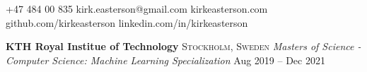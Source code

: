 \documentclass[10pt,letterpaper]{article}
\begin{document}


\begin{center}\spacedhrule{-.9em}{-.9em}\end{center}
\small +47 484 00 835 \hfill{}\hfill kirk.easterson@gmail.com \hfill{}\hfill kirkeasterson.com \hfill{}\hfill github.com/kirkeasterson \hfill{}\hfill linkedin.com/in/kirkeasterson
\begin{center}\spacedhrule{-.4em}{-1.3em}\end{center}













\headedsection
{\textbf{KTH Royal Institue of Technology}}
{\textsc{Stockholm, Sweden}} {
	\headedsubsection
	{\textit{Masters of Science - Computer Science: Machine Learning Specialization}}
	{Aug 2019 -- Dec 2021}
	{\bodytext{}}
}
\vspace{-5mm}
\end{document}
